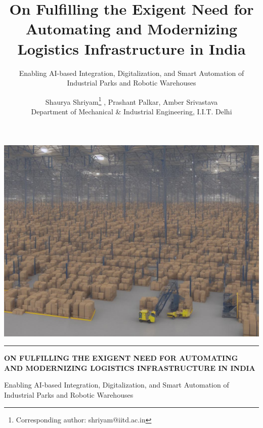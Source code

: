 \documentclass[paper=a4wide, fontsize=12pt]{scrartcl}	 %
\title{\vspace{-1.8cm}  \color{DarkRed} On Fulfilling the Exigent Need for Automating and Modernizing Logistics Infrastructure in India}
\subtitle{Enabling AI-based Integration, Digitalization, and Smart Automation of Industrial Parks and Robotic Warehouses
}
\author{Shaurya Shriyam\footnote{Corresponding author: shriyam@iitd.ac.in} , Prashant Palkar, Amber Srivastava \\ Department of Mechanical \& Industrial Engineering, I.I.T. Delhi
\vspace{-2cm} }
\date{} %
\begin{document}
\begin{titlepage}
    \centering

    \includegraphics[width=17cm]{nlpcover.jpg}
    \noindent\textcolor{Goldenrod}{\rule{17cm}{1mm}}
    \vspace{0.5cm}
    \begin{spacing}{1.75}
    {\justify \bfseries \Huge ON FULFILLING THE EXIGENT NEED FOR AUTOMATING AND MODERNIZING LOGISTICS INFRASTRUCTURE IN INDIA}
    \end{spacing}
    \vspace{0.2cm}
    \begin{spacing}{1.5}
    {\Large
        Enabling AI-based Integration, Digitalization, and Smart Automation of Industrial Parks and Robotic Warehouses}
    \end{spacing}

\end{titlepage}


\maketitle



\vspace{0.5cm}
\end{document}
